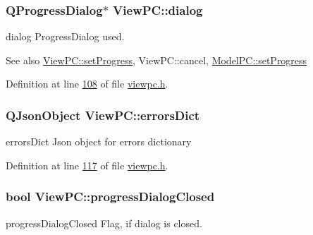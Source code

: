 \subsubsection[{\texorpdfstring{dialog}{dialog}}]{\setlength{\rightskip}{0pt plus 5cm}Q\+Progress\+Dialog$\ast$ View\+P\+C\+::dialog}\hypertarget{class_view_p_c_a31abbb470fe329b44e6ffee202b903ca}{}\label{class_view_p_c_a31abbb470fe329b44e6ffee202b903ca}


dialog Progress\+Dialog used. 

\begin{DoxySeeAlso}{See also}
\hyperlink{class_view_p_c_a9c32a1fdb6ead84e5ada8fba8860c7ed}{View\+P\+C\+::set\+Progress}, View\+P\+C\+::cancel, \hyperlink{class_model_p_c_afdcd80f0ed5062e145a71f09b0897547}{Model\+P\+C\+::set\+Progress} 
\end{DoxySeeAlso}


Definition at line \hyperlink{viewpc_8h_source_l00108}{108} of file \hyperlink{viewpc_8h_source}{viewpc.\+h}.

\subsubsection[{\texorpdfstring{errors\+Dict}{errorsDict}}]{\setlength{\rightskip}{0pt plus 5cm}Q\+Json\+Object View\+P\+C\+::errors\+Dict}\hypertarget{class_view_p_c_a26f90436aca32e5bad46f5e69a7e7e09}{}\label{class_view_p_c_a26f90436aca32e5bad46f5e69a7e7e09}


errors\+Dict Json object for errors dictionary 



Definition at line \hyperlink{viewpc_8h_source_l00117}{117} of file \hyperlink{viewpc_8h_source}{viewpc.\+h}.

\subsubsection[{\texorpdfstring{progress\+Dialog\+Closed}{progressDialogClosed}}]{\setlength{\rightskip}{0pt plus 5cm}bool View\+P\+C\+::progress\+Dialog\+Closed}\hypertarget{class_view_p_c_add8c82aa2b0b934212aa5bde9277ab36}{}\label{class_view_p_c_add8c82aa2b0b934212aa5bde9277ab36}


progress\+Dialog\+Closed Flag, if dialog is closed. 

